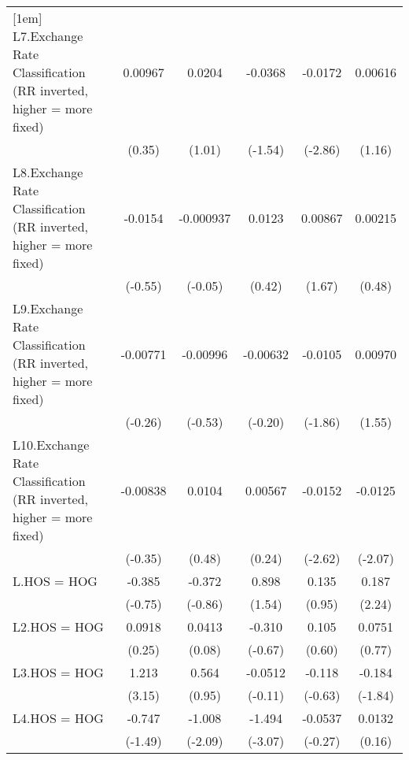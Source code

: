 {\begin{tabular}{l*{5}{c}}
[1em]
L7.Exchange Rate Classification (RR inverted, higher = more fixed)&  0.00967         &   0.0204         &  -0.0368         &  -0.0172\sym{**} &  0.00616         \\
                &   (0.35)         &   (1.01)         &  (-1.54)         &  (-2.86)         &   (1.16)         \\
[1em]
L8.Exchange Rate Classification (RR inverted, higher = more fixed)&  -0.0154         &-0.000937         &   0.0123         &  0.00867         &  0.00215         \\
                &  (-0.55)         &  (-0.05)         &   (0.42)         &   (1.67)         &   (0.48)         \\
[1em]
L9.Exchange Rate Classification (RR inverted, higher = more fixed)& -0.00771         & -0.00996         & -0.00632         &  -0.0105         &  0.00970         \\
                &  (-0.26)         &  (-0.53)         &  (-0.20)         &  (-1.86)         &   (1.55)         \\
[1em]
L10.Exchange Rate Classification (RR inverted, higher = more fixed)& -0.00838         &   0.0104         &  0.00567         &  -0.0152\sym{**} &  -0.0125\sym{*}  \\
                &  (-0.35)         &   (0.48)         &   (0.24)         &  (-2.62)         &  (-2.07)         \\
[1em]
L.HOS = HOG     &   -0.385         &   -0.372         &    0.898         &    0.135         &    0.187\sym{*}  \\
                &  (-0.75)         &  (-0.86)         &   (1.54)         &   (0.95)         &   (2.24)         \\
[1em]
L2.HOS = HOG    &   0.0918         &   0.0413         &   -0.310         &    0.105         &   0.0751         \\
                &   (0.25)         &   (0.08)         &  (-0.67)         &   (0.60)         &   (0.77)         \\
[1em]
L3.HOS = HOG    &    1.213\sym{**} &    0.564         &  -0.0512         &   -0.118         &   -0.184         \\
                &   (3.15)         &   (0.95)         &  (-0.11)         &  (-0.63)         &  (-1.84)         \\
[1em]
L4.HOS = HOG    &   -0.747         &   -1.008\sym{*}  &   -1.494\sym{**} &  -0.0537         &   0.0132         \\
                &  (-1.49)         &  (-2.09)         &  (-3.07)         &  (-0.27)         &   (0.16)         \\

\end{tabular}}

